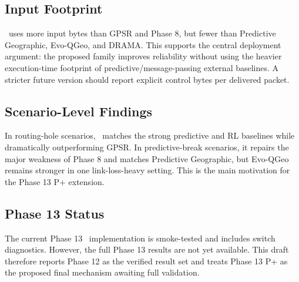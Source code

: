 \subsection{Input Footprint}
\phaseTwelve\ uses more input bytes than GPSR and Phase 8, but fewer than Predictive Geographic, Evo-QGeo, and DRAMA. This supports the central deployment argument: the proposed family improves reliability without using the heavier execution-time footprint of predictive/message-passing external baselines. A stricter future version should report explicit control bytes per delivered packet.

\subsection{Scenario-Level Findings}
In routing-hole scenarios, \phaseTwelve\ matches the strong predictive and RL baselines while dramatically outperforming GPSR. In predictive-break scenarios, it repairs the major weakness of Phase 8 and matches Predictive Geographic, but Evo-QGeo remains stronger in one link-loss-heavy setting. This is the main motivation for the Phase 13 P+ extension.

\subsection{Phase 13 Status}
The current Phase 13 \method\ implementation is smoke-tested and includes switch diagnostics. However, the full Phase 13 results are not yet available. This draft therefore reports Phase 12 as the verified result set and treats Phase 13 P+ as the proposed final mechanism awaiting full validation.
